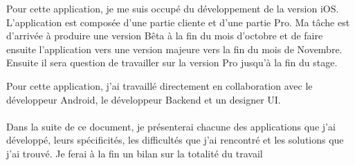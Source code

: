 Pour cette application, je me suis occupé du développement de la version iOS. L'application est composée d'une partie cliente et d'une partie Pro. Ma tâche est d'arrivée à produire une version Bêta à la fin du mois d'octobre et de faire ensuite l'application vers une version majeure vers la fin du mois de Novembre. Ensuite il sera question de travailler sur la version Pro jusqu'à la fin du stage.

Pour cette application, j'ai travaillé directement en collaboration avec le développeur Android, le développeur Backend et un designer UI.
\paragraph*{}
Dans la suite de ce document, je présenterai chacune des applications que j'ai développé, leurs spécificités, les difficultés que j'ai rencontré et les solutions que j'ai trouvé. Je ferai à la fin un bilan sur la totalité du travail 